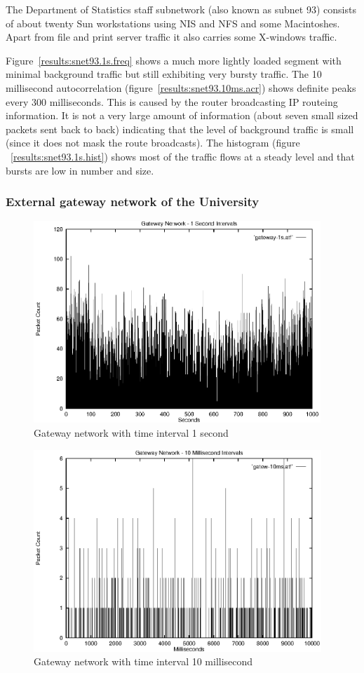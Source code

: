 The Department of Statistics staff subnetwork (also known as subnet
93) consists of about twenty Sun workstations using NIS and NFS
and some Macintoshes.  Apart from file and print server traffic it
also carries some X-windows traffic.

Figure~\ref{results:snet93.1s.freq} shows a much more lightly loaded
segment with minimal background traffic but still exhibiting very
bursty traffic.  The 10 millisecond autocorrelation
(figure~\ref{results:snet93.10ms.acr}) shows definite peaks every 300
milliseconds.  This is caused by the router broadcasting IP routeing
information.  It is not a very large amount of information (about
seven small sized packets sent back to back) indicating that the level
of background traffic is small (since it does not mask the route
broadcasts).  The histogram (figure ~\ref{results:snet93.1s.hist})
shows most of the traffic flows at a steady level and that bursts are
low in number and size.

\subsubsection{External gateway network of the University}

\begin{figure}
\includegraphics[height=3in]{pics/gatew-1s-freq.eps}
\caption{Gateway network with time interval 1 second}
\label{results:gatew.1s.freq}
\end{figure}

\begin{figure}
\includegraphics[height=3in]{pics/gatew-10ms-freq.eps}
\caption{Gateway network with time interval 10 millisecond}
\label{results:gatew.10ms.freq}
\end{figure}

